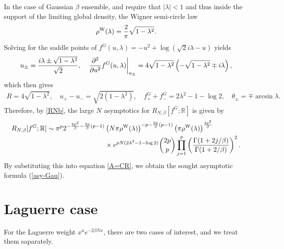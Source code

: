 \documentclass[11pt,a4paper]{article}
\numberwithin{equation}{section} %
\theoremstyle{plain}
\theoremstyle{definition}
\numberwithin{prop}{section}
\numberwithin{cor}{section}
\numberwithin{remark}{section}
\begin{document}
In the case of Gaussian $\beta$ ensemble, and require that $|\lambda| < 1$ and thus inside the support of the limiting global density, the 
Wigner semi-circle law 
\begin{align}\label{semi-cir-law}
    \rho^{\rm W}(\lambda)={2\over\pi}\sqrt{1-\lambda^2}.
\end{align}
Solving for the saddle points of $f^G(u,\lambda)=-u^2+\log(\sqrt{2}i\lambda-u)$ yields
\begin{align*}
	u_{\pm}={i\lambda\pm \sqrt{1-\lambda^2}\over\sqrt{2}},\quad \left.\frac{\partial^2}{\partial u^2} f^G(u, \lambda)\right|_{u_{ \pm}}=4\sqrt{1-\lambda^2}\left(-\sqrt{1-\lambda^2}\mp i\lambda\right),
\end{align*}
which then gives
\begin{align*}
	R=4\sqrt{1-\lambda^2},\quad u_{+}-u_{-}=\sqrt{2(1-\lambda^2)},\quad f^G_{+}+f^G_{-}=2\lambda^2-1-\log2,\quad \theta_{ \pm}=\mp \arcsin \lambda.
\end{align*}
Therefore, by \eqref{RNb}, the large $N$ asymptotics for $R_{N,\beta}[f^G;\mathbb{R}]$ is given by
\begin{align*}
	R_{N,\beta}[f^G;\mathbb{R}]\sim\pi^{p}2^{-{2p^2\over \beta}-{2p\over \beta}(p-1)}&\left(N\pi\rho^{\rm W}(\lambda)\right)^{-p-{2p\over\beta}(p-1)}\left(\pi\rho^{\rm W}(\lambda)\right)^{4p^2\over \beta}\\
    &\times 
    e^{pN(2\lambda^2-1-\log 2)}\binom{2p}{p}\prod_{j=1}^{p}\left({\Gamma(1+2j/\beta)\over \Gamma(1+2/\beta)}\right)^{2}.
\end{align*}
By substituting this into equation \eqref{A=CR}, we obtain the sought asymptotic formula 
(\ref{asy-Gau}).



\section{Laguerre case}\label{Lag-sec}
For the Laguerre weight $x^{a}e^{-2\beta Nx}$, there are two cases of interest, and we treat them saparately.
\end{document}
